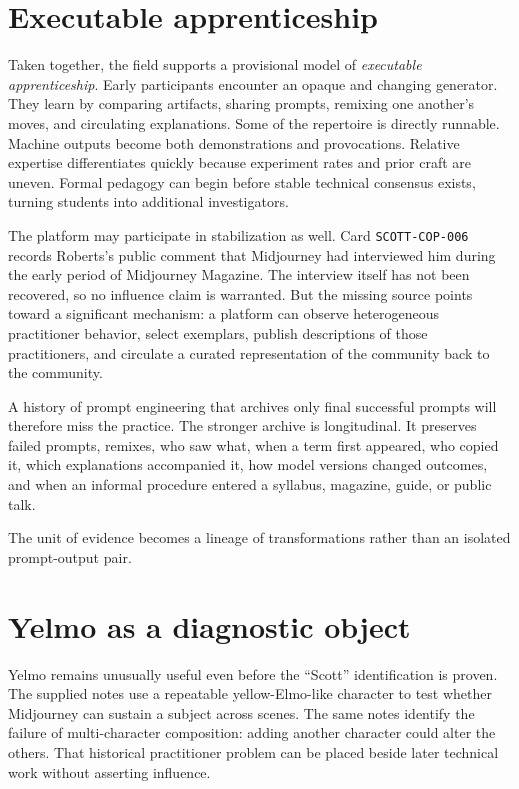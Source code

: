 \documentclass[11pt]{article}
\begin{document}
\section{Executable apprenticeship}

Taken together, the field supports a provisional model of \emph{executable apprenticeship}. Early participants encounter an opaque and changing generator. They learn by comparing artifacts, sharing prompts, remixing one another's moves, and circulating explanations. Some of the repertoire is directly runnable. Machine outputs become both demonstrations and provocations. Relative expertise differentiates quickly because experiment rates and prior craft are uneven. Formal pedagogy can begin before stable technical consensus exists, turning students into additional investigators.

The platform may participate in stabilization as well. Card \texttt{SCOTT-COP-006} records Roberts's public comment that Midjourney had interviewed him during the early period of Midjourney Magazine. The interview itself has not been recovered, so no influence claim is warranted. But the missing source points toward a significant mechanism: a platform can observe heterogeneous practitioner behavior, select exemplars, publish descriptions of those practitioners, and circulate a curated representation of the community back to the community.

A history of prompt engineering that archives only final successful prompts will therefore miss the practice. The stronger archive is longitudinal. It preserves failed prompts, remixes, who saw what, when a term first appeared, who copied it, which explanations accompanied it, how model versions changed outcomes, and when an informal procedure entered a syllabus, magazine, guide, or public talk.

The unit of evidence becomes a lineage of transformations rather than an isolated prompt-output pair.

\section{Yelmo as a diagnostic object}

Yelmo remains unusually useful even before the ``Scott'' identification is proven. The supplied notes use a repeatable yellow-Elmo-like character to test whether Midjourney can sustain a subject across scenes. The same notes identify the failure of multi-character composition: adding another character could alter the others. That historical practitioner problem can be placed beside later technical work without asserting influence.
\end{document}

